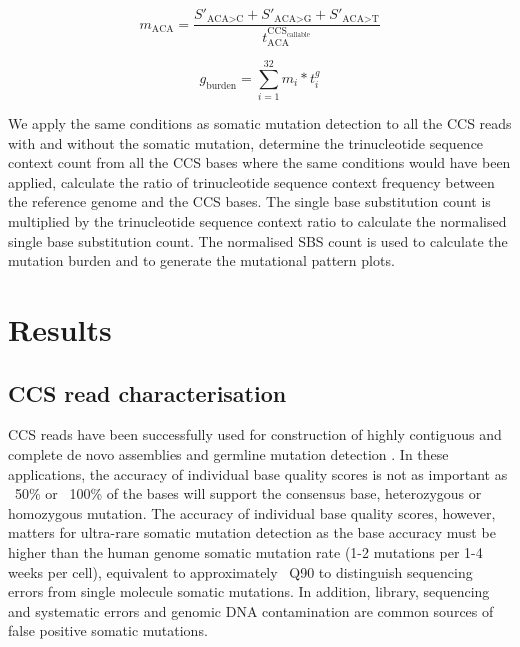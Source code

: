 \begin{equation}
m_{\text{ACA}} = \frac{S'_{\text{ACA>C}} + S'_{\text{ACA>G}} + S'_{\text{ACA>T}}}{t^{\text{CCS}_{\text{callable}}}_{\text{ACA}}} 
\end{equation}

\begin{equation}
g_{\text{burden}} = \sum^{32}_{i=1} m_{i} * t^{g}_{i}
\end{equation}




We apply the same conditions as somatic mutation detection to all the CCS reads with and without the somatic mutation, determine the trinucleotide sequence context count from all the CCS bases where the same conditions would have been applied, calculate the ratio of trinucleotide sequence context frequency between the reference genome and the CCS bases. The single base substitution count is multiplied by the trinucleotide sequence context ratio to calculate the normalised single base substitution count. The normalised SBS count is used to calculate the mutation burden and to generate the mutational pattern plots. 

\section{Results}

\subsection{CCS read characterisation}

CCS reads have been successfully used for construction of highly contiguous and complete de novo assemblies \cite{} and germline mutation detection \cite{}. In these applications, the accuracy of individual base quality scores is not as important as ~50\% or ~100\% of the bases will support the consensus base, heterozygous or homozygous mutation. The accuracy of individual base quality scores, however, matters for ultra-rare somatic mutation detection as the base accuracy must be higher than the human genome somatic mutation rate (1-2 mutations per 1-4 weeks per cell), equivalent to approximately ~Q90 to distinguish sequencing errors from single molecule somatic mutations. In addition, library, sequencing and systematic errors and genomic DNA contamination are common sources of false positive somatic mutations. 

